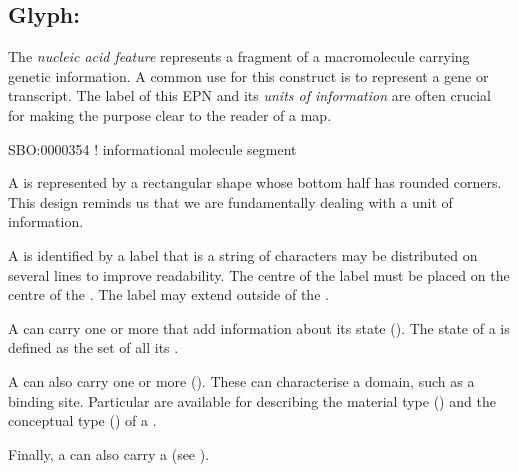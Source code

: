 
\subsection{Glyph: }
\label{sec:genetic}

The \emph{nucleic acid feature} represents a fragment of a macromolecule carrying genetic information.
A common use for this construct is to represent a gene or transcript.
The label of this EPN and its \emph{units of information} are often crucial for making the purpose clear to the reader of a map.

\begin{glyphDescription}

\glyphSboTerm
SBO:0000354 ! informational molecule segment



\glyphContainer
A  is represented by a rectangular shape whose bottom half has rounded corners.
This design reminds us that we are fundamentally dealing with a unit of information.

\glyphLabel
A  is identified by a label that is  a string of characters  may be distributed on several lines to improve readability.
The centre of the label must be placed on the centre of the .
The label may extend outside of the .

\glyphAux
A  can carry one or more  that add information about its state ().
The state of a  is defined as the set of all its .

A  can also carry one or more  ().
These can characterise a domain, such as a binding site.
Particular  are available for describing the material type () and the conceptual type () of a .

Finally, a  can also carry a  (see ).

\end{glyphDescription}

